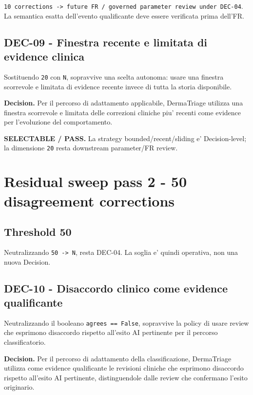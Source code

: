 \documentclass[11pt,a4paper]{article}
\begin{document}
\begin{ddtacore}[title={Routing}]
\texttt{10 corrections -> future FR / governed parameter review under DEC-04}. La semantica esatta dell'evento qualificante deve essere verificata prima dell'FR.
\end{ddtacore}

\subsection{DEC-09 - Finestra recente e limitata di evidence clinica}
Sostituendo \texttt{20} con \texttt{N}, sopravvive una scelta autonoma: usare una finestra scorrevole e limitata di evidence recente invece di tutta la storia disponibile.

\textbf{Decision.} Per il percorso di adattamento applicabile, DermaTriage utilizza una finestra scorrevole e limitata delle correzioni cliniche piu' recenti come evidence per l'evoluzione del comportamento.

\begin{ddtacore}[title={Disposition}]
\textbf{SELECTABLE / PASS.} La strategy bounded/recent/sliding e' Decision-level; la dimensione \texttt{20} resta downstream parameter/FR review.
\end{ddtacore}

\section{Residual sweep pass 2 - 50 disagreement corrections}
\subsection{Threshold 50}
Neutralizzando \texttt{50 -> N}, resta DEC-04. La soglia e' quindi operativa, non una nuova Decision.

\subsection{DEC-10 - Disaccordo clinico come evidence qualificante}
Neutralizzando il booleano \texttt{agrees == False}, sopravvive la policy di usare review che esprimono disaccordo rispetto all'esito AI pertinente per il percorso classificatorio.

\textbf{Decision.} Per il percorso di adattamento della classificazione, DermaTriage utilizza come evidence qualificante le revisioni cliniche che esprimono disaccordo rispetto all'esito AI pertinente, distinguendole dalle review che confermano l'esito originario.
\end{document}
